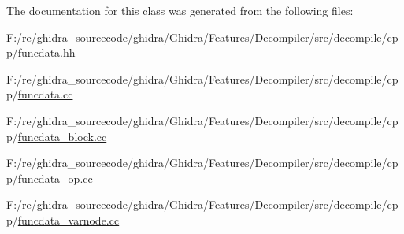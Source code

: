 The documentation for this class was generated from the following files\+:\begin{DoxyCompactItemize}
\item 
F\+:/re/ghidra\+\_\+sourcecode/ghidra/\+Ghidra/\+Features/\+Decompiler/src/decompile/cpp/\mbox{\hyperlink{funcdata_8hh}{funcdata.\+hh}}\item 
F\+:/re/ghidra\+\_\+sourcecode/ghidra/\+Ghidra/\+Features/\+Decompiler/src/decompile/cpp/\mbox{\hyperlink{funcdata_8cc}{funcdata.\+cc}}\item 
F\+:/re/ghidra\+\_\+sourcecode/ghidra/\+Ghidra/\+Features/\+Decompiler/src/decompile/cpp/\mbox{\hyperlink{funcdata__block_8cc}{funcdata\+\_\+block.\+cc}}\item 
F\+:/re/ghidra\+\_\+sourcecode/ghidra/\+Ghidra/\+Features/\+Decompiler/src/decompile/cpp/\mbox{\hyperlink{funcdata__op_8cc}{funcdata\+\_\+op.\+cc}}\item 
F\+:/re/ghidra\+\_\+sourcecode/ghidra/\+Ghidra/\+Features/\+Decompiler/src/decompile/cpp/\mbox{\hyperlink{funcdata__varnode_8cc}{funcdata\+\_\+varnode.\+cc}}\end{DoxyCompactItemize}
